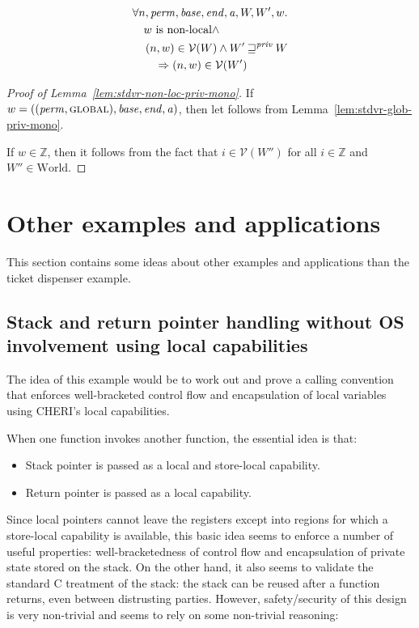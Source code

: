 \documentclass[a4paper]{article}
\newcommand{\var}[1]{\mathit{#1}}
\newcommand{\gl}{\var{g}}
\newcommand{\addr}{\var{a}}
\newcommand{\start}{\var{base}}
\newcommand{\addrend}{\var{end}}
\newcommand{\perm}{\var{perm}}
\newcommand{\stdcap}[1][(\perm,\gl)]{\left(#1,\start,\addrend,\addr \right)}
\newcommand{\futurestr}{\mathbin{\sqsupseteq}^{\var{priv}}}
\newcommand{\asmType}{\plaindom{AsmType}}
\newcommand{\plaindom}[1]{\mathrm{#1}}
\newcommand{\ints}{\mathbb{Z}}
\newcommand{\Worlds}{\plaindom{World}}
\newcommand{\intr}[2]{\mathcal{#1}}
\newcommand{\valueintr}[1]{\intr{V}{#1}}
\newcommand{\stdvr}{\valueintr{\asmType}}
\newcommand{\npair}[2][n]{\left(#1,#2 \right)}
\newcommand{\plainperm}[1]{\textsc{#1}}
\newcommand{\glob}{\plainperm{global}}
\newcommand{\nonlocal}[1]{\ensuremath{#1} \text{ is non-local}}
\begin{document}
\begin{lemma}[Non local words monotone wrt $\futurestr$]
  \label{lem:stdvr-non-loc-priv-mono}
  \begin{align*}
    & \forall n, \perm, \start, \addrend, \addr, W, W',w \ldotp \\
    & \quad \nonlocal{w} \land \\
    & \quad \npair{w} \in \stdvr(W) \land W' \futurestr W \\
    & \qquad \Rightarrow \npair{w} \in \stdvr(W') 
  \end{align*}
\end{lemma}
\begin{proof}[Proof of Lemma~\ref{lem:stdvr-non-loc-priv-mono}]
  If $w = \stdcap[(\perm,\glob)]$, then let follows from Lemma~\ref{lem:stdvr-glob-priv-mono}.

  If $w \in \ints$, then it follows from the fact that $i \in \stdvr(W'')$ for all $i \in \ints$ and $W'' \in \Worlds$.
\end{proof}

\section{Other examples and applications}
\label{sec:other_apps}
This section contains some ideas about other examples and applications than the
ticket dispenser example.

\subsection{Stack and return pointer handling without OS involvement using local
  capabilities}
The idea of this example would be to work out and prove a calling convention
that enforces well-bracketed control flow and encapsulation of local variables
using CHERI's local capabilities.

When one function invokes another function, the essential idea is that:
\begin{itemize}
\item Stack pointer is passed as a local and store-local capability.
\item Return pointer is passed as a local capability.
\end{itemize}

Since local pointers cannot leave the registers except into regions for which a
store-local capability is available, this basic idea seems to enforce a number
of useful properties: well-bracketedness of control flow and encapsulation of
private state stored on the stack. On the other hand, it also seems to validate
the standard C treatment of the stack: the stack can be reused after a function
returns, even between distrusting parties. However, safety/security of this
design is very non-trivial and seems to rely on some non-trivial reasoning:
\end{document}
